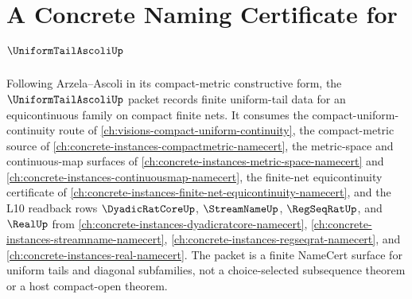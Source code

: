 \chapter{A Concrete Naming Certificate for $\UniformTailAscoliUp$}
\label{ch:concrete-instances-uniform-tail-ascoli-namecert}

Following Arzela--Ascoli in its compact-metric constructive form, the $\UniformTailAscoliUp$ packet records finite uniform-tail data for an equicontinuous family on compact finite nets. It consumes the compact-uniform-continuity route of \autoref{ch:visions-compact-uniform-continuity}, the compact-metric source of \autoref{ch:concrete-instances-compactmetric-namecert}, the metric-space and continuous-map surfaces of \autoref{ch:concrete-instances-metric-space-namecert} and \autoref{ch:concrete-instances-continuousmap-namecert}, the finite-net equicontinuity certificate of \autoref{ch:concrete-instances-finite-net-equicontinuity-namecert}, and the L10 readback rows $\DyadicRatCoreUp$, $\StreamNameUp$, $\RegSeqRatUp$, and $\RealUp$ from \autoref{ch:concrete-instances-dyadicratcore-namecert}, \autoref{ch:concrete-instances-streamname-namecert}, \autoref{ch:concrete-instances-regseqrat-namecert}, and \autoref{ch:concrete-instances-real-namecert}. The packet is a finite NameCert surface for uniform tails and diagonal subfamilies, not a choice-selected subsequence theorem or a host compact-open theorem.

